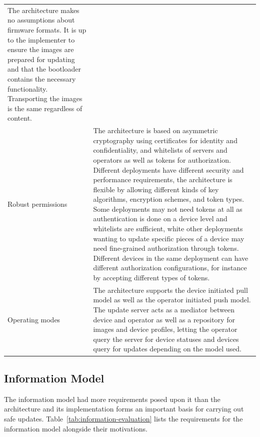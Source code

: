 \documentclass[0-thesis.tex]{subfiles}
\begin{document}
\begin{longtable}[]{@{}ll@{}}
\begin{minipage}[t]{0.53\columnwidth}
    The architecture makes no assumptions about firmware formats. It is up
    to the implementer to ensure the images are prepared for updating and
    that the bootloader contains the necessary functionality. Transporting
    the images is the same regardless of content.\strut
    \end{minipage}\tabularnewline
    \begin{minipage}[t]{0.41\columnwidth}\raggedright\strut
    Robust permissions\strut
    \end{minipage} & \begin{minipage}[t]{0.53\columnwidth}\raggedright\strut
    The architecture is based on asymmetric cryptography using certificates
    for identity and confidentiality, and whitelists of servers and
    operators as well as tokens for authorization. Different deployments
    have different security and performance requirements, the architecture
    is flexible by allowing different kinds of key algorithms, encryption
    schemes, and token types. Some deployments may not need tokens at all as
    authentication is done on a device level and whitelists are sufficient,
    white other deployments wanting to update specific pieces of a device
    may need fine-grained authorization through tokens. Different devices in
    the same deployment can have different authorization configurations, for
    instance by accepting different types of tokens.\strut
    \end{minipage}\tabularnewline
    \begin{minipage}[t]{0.41\columnwidth}\raggedright\strut
    Operating modes\strut
    \end{minipage} & \begin{minipage}[t]{0.53\columnwidth}\raggedright\strut
    The architecture supports the device initiated pull model as well as the
    operator initiated push model. The update server acts as a mediator
    between device and operator as well as a repository for images and
    device profiles, letting the operator query the server for device
    statuses and devices query for updates depending on the model
    used.\strut
    \end{minipage}\tabularnewline
    \bottomrule
\end{longtable}
  
\subsection{Information Model}
\label{ssec:information-evaluation}
The information model had more requirements posed upon it than the architecture and its
implementation forms an important basis for carrying out safe updates.
Table~\ref{tab:information-evaluation} lists the requirements for the information model
alongside their motivations.
\end{document}

